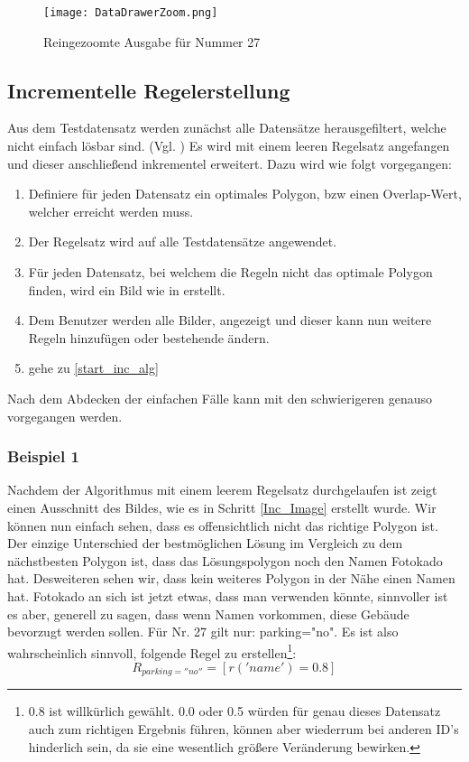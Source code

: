 \begin{figure}
 \centering
 \texttt{[image: DataDrawerZoom.png]}
 \caption{Reingezoomte Ausgabe für Nummer 27}
 \label{fig:DataDrawerZoom}
\end{figure}

\subsection{Incrementelle Regelerstellung}
Aus dem Testdatensatz werden zunächst alle Datensätze herausgefiltert, welche nicht einfach lösbar sind.
(Vgl. )
Es wird mit einem leeren Regelsatz angefangen und dieser anschließend inkrementel erweitert. Dazu wird wie folgt vorgegangen:
\begin{enumerate}
\itemsep-2pt
\item Definiere für jeden Datensatz ein optimales Polygon, bzw einen Overlap-Wert, welcher erreicht werden muss.
\item Der Regelsatz wird auf alle Testdatensätze angewendet. \label{start_inc_alg}
\item Für jeden Datensatz, bei welchem die Regeln nicht das optimale Polygon finden, wird ein Bild wie in  erstellt. \label{Inc_Image}
\item Dem Benutzer werden alle Bilder, angezeigt und dieser kann nun weitere Regeln hinzufügen oder bestehende ändern.
\item gehe zu \ref{start_inc_alg}
\end{enumerate}

Nach dem Abdecken der einfachen Fälle kann mit den schwierigeren genauso vorgegangen werden.

\subsubsection{Beispiel 1}
Nachdem der Algorithmus mit einem leerem Regelsatz durchgelaufen ist zeigt
 einen Ausschnitt des Bildes, wie es in Schritt \ref{Inc_Image} erstellt wurde. Wir können nun einfach sehen,
dass es offensichtlich nicht das richtige Polygon ist. Der einzige Unterschied der bestmöglichen Lösung im Vergleich zu dem nächstbesten Polygon ist,
dass das Lösungspolygon noch den Namen Fotokado hat. Desweiteren sehen wir, dass kein weiteres Polygon in der Nähe einen Namen hat.
Fotokado an sich ist jetzt etwas, dass man verwenden könnte, sinnvoller ist es aber, generell zu sagen, dass wenn Namen vorkommen, diese Gebäude
bevorzugt werden sollen. Für Nr. 27 gilt nur: parking="no". Es ist also wahrscheinlich sinnvoll, folgende Regel zu erstellen\footnote{0.8 ist willkürlich gewählt.
0.0 oder 0.5 würden für genau dieses Datensatz auch zum richtigen Ergebnis führen, können aber wiederrum bei anderen ID's hinderlich sein,
da sie eine wesentlich größere Veränderung bewirken.}:
\begin{equation*}
R_{parking=''no''} = [r('name') = 0.8]
\end{equation*}

